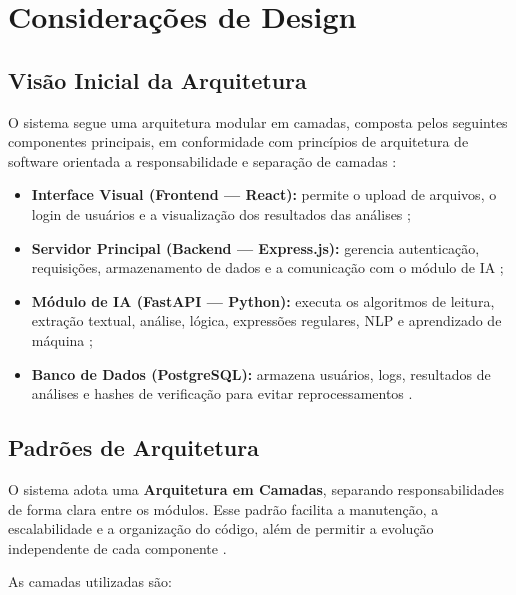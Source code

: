 \section{Considerações de Design}

\subsection{Visão Inicial da Arquitetura}

O sistema segue uma arquitetura modular em camadas, composta pelos seguintes componentes principais, em conformidade com princípios de arquitetura de software orientada a responsabilidade e separação de camadas \cite{bass_software_architecture_2012}:

\begin{itemize}
    \item \textbf{Interface Visual (Frontend — React):} permite o upload de arquivos, o login de usuários e a visualização dos resultados das análises \cite{react_docs_2024};
    
    \item \textbf{Servidor Principal (Backend — Express.js):} gerencia autenticação, requisições, armazenamento de dados e a comunicação com o módulo de IA \cite{nodejs_docs_2024};
    
    \item \textbf{Módulo de IA (FastAPI — Python):} executa os algoritmos de leitura, extração textual, análise, lógica, expressões regulares, NLP e aprendizado de máquina \cite{fastapi_docs_2024};
    
    \item \textbf{Banco de Dados (PostgreSQL):} armazena usuários, logs, resultados de análises e hashes de verificação para evitar reprocessamentos \cite{postgresql_docs_2024}.
\end{itemize}


\subsection{Padrões de Arquitetura}

O sistema adota uma \textbf{Arquitetura em Camadas}, separando responsabilidades de forma clara entre os módulos. Esse padrão facilita a manutenção, a escalabilidade e a organização do código, além de permitir a evolução independente de cada componente \cite{bass_software_architecture_2012}.

As camadas utilizadas são:

